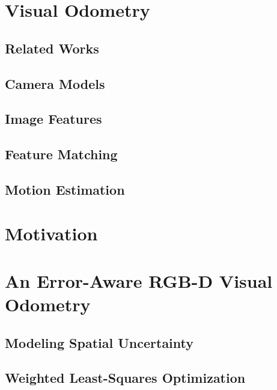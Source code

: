 \documentclass[a4paper]{report}
\numberwithin{figure}{section}
\begin{document}
\chapter{Visual Odometry} \label{cp_vo}

\section{Related Works} \label{sc_related_works}

\section{Camera Models} \label{sc_cam_models}

\section{Image Features} \label{sc_img_features}

\section{Feature Matching} \label{sc_feature_matching}

\section{Motion Estimation} \label{sc_motion_estim}

\chapter{Motivation} \label{cp_motivation}

\chapter{An Error-Aware RGB-D Visual Odometry} \label{cp_covo}

\section{Modeling Spatial Uncertainty} \label{sc_spatial_uncertainty}

\section{Weighted Least-Squares Optimization} \label{sc_weighted_lsq}
\end{document}
